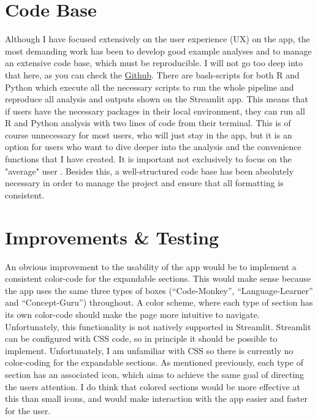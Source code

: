 \documentclass[12pt]{article}
\begin{document}
\section{Code Base}
Although I have focused extensively on the user experience (UX) on the app,
the most demanding work has been to develop good example analyses and to manage an extensive
code base, which must be reproducible. I will not go too deep into that here,
as you can check the
\href{https://github.com/victor-m-p/BayesWorkflow}{Github}.
There are bash-scripts for both R and Python
which execute all the necessary scripts to run the whole pipeline
and reproduce all analysis and outputs shown on the Streamlit app. This means that if users have
the necessary packages in their local environment, they can run all R and Python analysis
with two lines of code from their terminal. This is of course unnecessary for most users,
who will just stay in the app, but it is an option for users who want to dive deeper
into the analysis and the convenience functions that I have created. It is
important not exclusively to focus on the "average" user
\autocite[14]{mills1992macintosh}.
Besides this, a well-structured code base has been absolutely necessary
in order to manage the project and ensure that all formatting is consistent.

\section{Improvements \& Testing}
An obvious improvement to the usability of the app would be to implement a consistent
color-code for the expandable sections. This would make sense
because the app uses the same three types of boxes (“Code-Monkey”, “Language-Learner” and “Concept-Guru”)
throughout. A color scheme, where each type of section has its own color-code
should make the page more intuitive to navigate. Unfortunately, this functionality
is not natively supported in Streamlit. Streamlit can be configured with CSS code,
so in principle it should be possible to implement. Unfortunately, I am unfamiliar
with CSS so there is currently no color-coding for the expandable sections.
As mentioned previously, each type of section has an associated icon,
which aims to achieve the same goal of directing the users attention.
I do think that colored sections would be more effective at this than small icons,
and would make interaction with the app easier and faster for the user.

\vspace{5mm}
\end{document}
